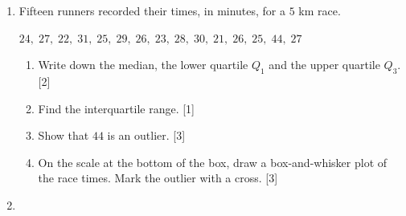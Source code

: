 \documentclass[12pt, twoside]{article}
\begin{document}
\begin{enumerate}[itemsep=0.15cm]

\newpage

\item[2.] [Maximum mark: 9]

Fifteen runners recorded their times, in minutes, for a $5$ km race.

\begin{center}
$24,\; 27,\; 22,\; 31,\; 25,\; 29,\; 26,\; 23,\; 28,\; 30,\; 21,\; 26,\;
25,\; 44,\; 27$
\end{center}

\begin{enumerate}[itemsep=0.1cm]
  \item Write down the median, the lower quartile $Q_{1}$ and the upper
  quartile $Q_{3}$. \hfill [2]
  \item Find the interquartile range. \hfill [1]
  \item Show that $44$ is an outlier. \hfill [3]
  \item On the scale at the bottom of the box, draw a box-and-whisker
  plot of the race times. Mark the outlier with a cross. \hfill [3]
\end{enumerate}


\newpage

\item[3.] [Maximum mark: 9]


\end{enumerate}
\end{document}
